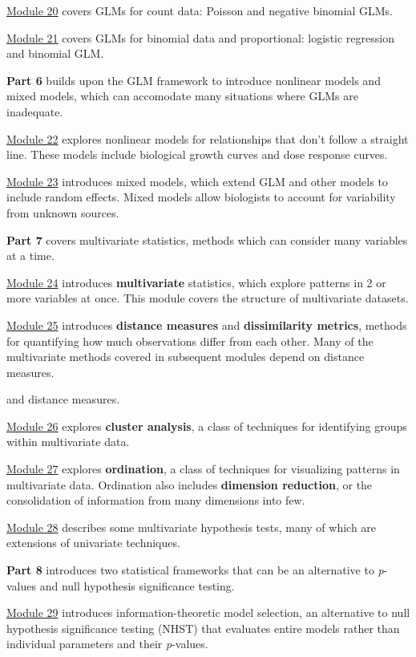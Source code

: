 \documentclass[
  13,
  letterpaper,
]{report}
\begin{document}
\hyperref[sec-glm3]{Module 20} covers GLMs for count data: Poisson and
negative binomial GLMs.

\hyperref[sec-glm4]{Module 21} covers GLMs for binomial data and
proportional: logistic regression and binomial GLM.

\textbf{Part 6} builds upon the GLM framework to introduce nonlinear
models and mixed models, which can accomodate many situations where GLMs
are inadequate.

\hyperref[sec-non]{Module 22} explores nonlinear models for
relationships that don't follow a straight line. These models include
biological growth curves and dose response curves.

\hyperref[sec-mixed]{Module 23} introduces mixed models, which extend
GLM and other models to include random effects. Mixed models allow
biologists to account for variability from unknown sources.

\textbf{Part 7} covers multivariate statistics, methods which can
consider many variables at a time.

\hyperref[sec-mdata]{Module 24} introduces \textbf{multivariate}
statistics, which explore patterns in 2 or more variables at once. This
module covers the structure of multivariate datasets.

\hyperref[sec-dist]{Module 25} introduces \textbf{distance measures} and
\textbf{dissimilarity metrics}, methods for quantifying how much
observations differ from each other. Many of the multivariate methods
covered in subsequent modules depend on distance measures.

and distance measures.

\hyperref[sec-clust]{Module 26} explores \textbf{cluster analysis}, a
class of techniques for identifying groups within multivariate data.

\hyperref[sec-ord]{Module 27} explores \textbf{ordination}, a class of
techniques for visualizing patterns in multivariate data. Ordination
also includes \textbf{dimension reduction}, or the consolidation of
information from many dimensions into few.

\hyperref[sec-mtest]{Module 28} describes some multivariate hypothesis
tests, many of which are extensions of univariate techniques.

\textbf{Part 8} introduces two statistical frameworks that can be an
alternative to \emph{p}-values and null hypothesis significance testing.

\hyperref[sec-it]{Module 29} introduces information-theoretic model
selection, an alternative to null hypothesis significance testing (NHST)
that evaluates entire models rather than individual parameters and their
\emph{p}-values.
\end{document}
